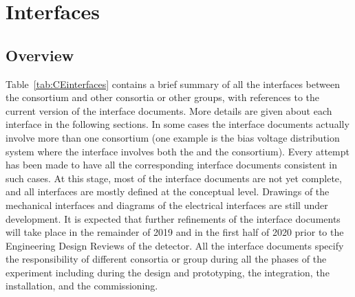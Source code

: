 \section{Interfaces}
\label{sec:fdsp-tpcelec-interfaces}

\subsection{Overview}
\label{sec:fdsp-tpcelec-interfaces-overview}

Table~\ref{tab:CEinterfaces} contains a brief summary of all the interfaces
between the  consortium and other consortia or other groups,
with references to the current version of the interface documents. More
details are given about each interface in the following sections.
In some cases the interface documents actually involve more than one 
consortium (one example is the bias voltage distribution system where
the interface involves both the  and the  consortium).
Every attempt has been made to have all the corresponding interface documents 
consistent in such cases. At this stage, most of the interface documents are
not yet complete, and all interfaces are mostly defined at the conceptual
level. Drawings of the mechanical interfaces and diagrams
of the electrical interfaces are still under development. It is expected 
that further refinements of the interface documents will take place in the
remainder of 2019 and in the first half of 2020 prior to the Engineering Design
Reviews of the detector. All the interface documents specify the responsibility
of different consortia or group during all the phases of the experiment
including during the design and prototyping, the integration, the installation,
and the commissioning.


